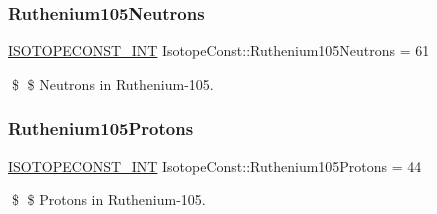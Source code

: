 \subsubsection{\texorpdfstring{Ruthenium105\+Neutrons}{Ruthenium105Neutrons}}
{\footnotesize\ttfamily \mbox{\hyperlink{group___isotope_const-_macros_ga5f18360b3e99483a35c32d789e62621c}{I\+S\+O\+T\+O\+P\+E\+C\+O\+N\+S\+T\+\_\+\+I\+NT}} Isotope\+Const\+::\+Ruthenium105\+Neutrons = 61}

\$ \$ Neutrons in Ruthenium-\/105. \mbox{\label{group___isotope_const-_ruthenium-_ru105_gaade22f3c9036b49f7138a25e45ad38aa}} 
\subsubsection{\texorpdfstring{Ruthenium105\+Protons}{Ruthenium105Protons}}
{\footnotesize\ttfamily \mbox{\hyperlink{group___isotope_const-_macros_ga5f18360b3e99483a35c32d789e62621c}{I\+S\+O\+T\+O\+P\+E\+C\+O\+N\+S\+T\+\_\+\+I\+NT}} Isotope\+Const\+::\+Ruthenium105\+Protons = 44}

\$ \$ Protons in Ruthenium-\/105. 